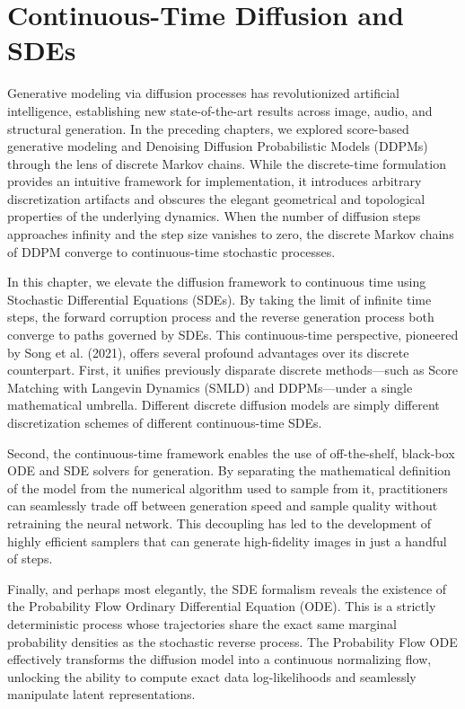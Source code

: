 \chapter{Continuous-Time Diffusion and SDEs}
\label{ch:sde}

Generative modeling via diffusion processes has revolutionized artificial intelligence, establishing new state-of-the-art results across image, audio, and structural generation. In the preceding chapters, we explored score-based generative modeling and Denoising Diffusion Probabilistic Models (DDPMs) through the lens of discrete Markov chains. While the discrete-time formulation provides an intuitive framework for implementation, it introduces arbitrary discretization artifacts and obscures the elegant geometrical and topological properties of the underlying dynamics. When the number of diffusion steps approaches infinity and the step size vanishes to zero, the discrete Markov chains of DDPM converge to continuous-time stochastic processes.

In this chapter, we elevate the diffusion framework to continuous time using Stochastic Differential Equations (SDEs). By taking the limit of infinite time steps, the forward corruption process and the reverse generation process both converge to paths governed by SDEs. This continuous-time perspective, pioneered by Song et al. (2021), offers several profound advantages over its discrete counterpart. First, it unifies previously disparate discrete methods---such as Score Matching with Langevin Dynamics (SMLD) and DDPMs---under a single mathematical umbrella. Different discrete diffusion models are simply different discretization schemes of different continuous-time SDEs. 

Second, the continuous-time framework enables the use of off-the-shelf, black-box ODE and SDE solvers for generation. By separating the mathematical definition of the model from the numerical algorithm used to sample from it, practitioners can seamlessly trade off between generation speed and sample quality without retraining the neural network. This decoupling has led to the development of highly efficient samplers that can generate high-fidelity images in just a handful of steps.

Finally, and perhaps most elegantly, the SDE formalism reveals the existence of the Probability Flow Ordinary Differential Equation (ODE). This is a strictly deterministic process whose trajectories share the exact same marginal probability densities as the stochastic reverse process. The Probability Flow ODE effectively transforms the diffusion model into a continuous normalizing flow, unlocking the ability to compute exact data log-likelihoods and seamlessly manipulate latent representations.

